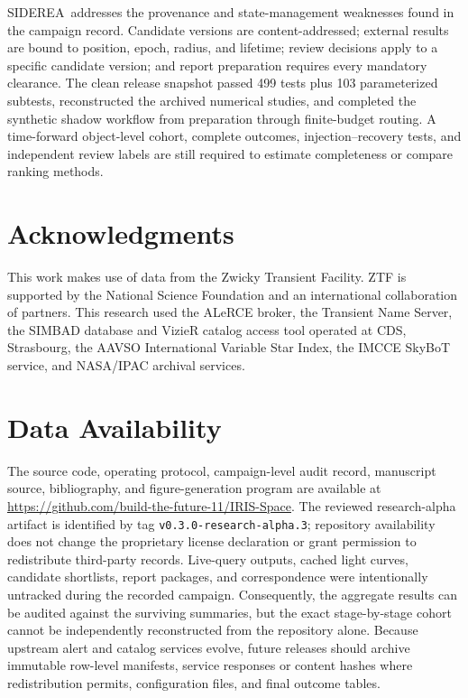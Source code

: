\documentclass[11pt]{article}
\newcommand{\siderea}{SIDEREA}
\begin{document}
\siderea\ addresses the provenance and state-management weaknesses found in the campaign record. Candidate versions are content-addressed; external results are bound to position, epoch, radius, and lifetime; review decisions apply to a specific candidate version; and report preparation requires every mandatory clearance. The clean release snapshot passed 499 tests plus 103 parameterized subtests, reconstructed the archived numerical studies, and completed the synthetic shadow workflow from preparation through finite-budget routing. A time-forward object-level cohort, complete outcomes, injection--recovery tests, and independent review labels are still required to estimate completeness or compare ranking methods.

\section*{Acknowledgments}

This work makes use of data from the Zwicky Transient Facility. ZTF is supported by the National Science Foundation and an international collaboration of partners. This research used the ALeRCE broker, the Transient Name Server, the SIMBAD database and VizieR catalog access tool operated at CDS, Strasbourg, the AAVSO International Variable Star Index, the IMCCE SkyBoT service, and NASA/IPAC archival services.

\section*{Data Availability}

The source code, operating protocol, campaign-level audit record, manuscript source, bibliography, and figure-generation program are available at \url{https://github.com/build-the-future-11/IRIS-Space}. The reviewed research-alpha artifact is identified by tag \texttt{v0.3.0-research-alpha.3}; repository availability does not change the proprietary license declaration or grant permission to redistribute third-party records. Live-query outputs, cached light curves, candidate shortlists, report packages, and correspondence were intentionally untracked during the recorded campaign. Consequently, the aggregate results can be audited against the surviving summaries, but the exact stage-by-stage cohort cannot be independently reconstructed from the repository alone. Because upstream alert and catalog services evolve, future releases should archive immutable row-level manifests, service responses or content hashes where redistribution permits, configuration files, and final outcome tables.
\end{document}
